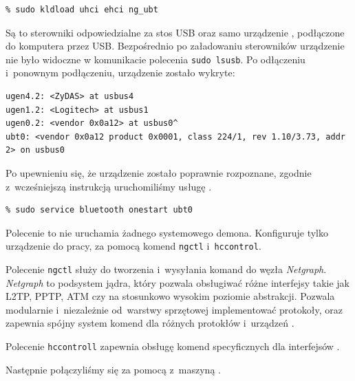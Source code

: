 \begin{lstlisting}
% sudo kldload uhci ehci ng_ubt
\end{lstlisting}

Są to sterowniki odpowiedzialne za stos USB oraz samo urządzenie \bt,
podłączone do komputera przez USB. Bezpośrednio po załadowaniu sterowników
urządzenie nie było widoczne w komunikacie polecenia \texttt{sudo lsusb}. Po
odłączeniu i~ponownym podłączeniu, urządzenie zostało wykryte:

\begin{lstlisting}[caption={Potwierdzenie w logu systemowym, że urządzenie \bt{} zostało wykryte.}]
% dmesg | tail
ugen4.2: <ZyDAS> at usbus4
ugen1.2: <Logitech> at usbus1
ugen0.2: <vendor 0x0a12> at usbus0^
ubt0: <vendor 0x0a12 product 0x0001, class 224/1, rev 1.10/3.73, addr 2> on usbus0
\end{lstlisting}

Po upewnieniu się, że urządzenie zostało poprawnie rozpoznane, zgodnie
z~wcześniejszą instrukcją uruchomiliśmy usługę \bt.

\begin{lstlisting}
% sudo service bluetooth onestart ubt0
\end{lstlisting}

Polecenie to nie uruchamia żadnego systemowego demona. Konfiguruje tylko
urządzenie \bt{} do pracy, za pomocą komend \texttt{ngctl} i~\texttt{hccontrol}.

Polecenie \texttt{ngctl} służy do tworzenia i~wysyłania komand do węzła
\emph{Netgraph}. \emph{Netgraph} to podsystem jądra, który pozwala obsługiwać
różne interfejsy takie jak L2TP, PPTP, ATM czy \bt{} na stosunkowo wysokim
poziomie abstrakcji. Pozwala modularnie i~niezależnie od~warstwy sprzętowej
implementować protokoły, oraz zapewnia spójny system komend dla różnych
protokłów i~urządzeń \cite{man:netgraph}.

Polecenie \texttt{hccontroll} zapewnia obsługę komend specyficznych dla
interfejsów \bt.

Następnie połączyliśmy się za pomocą \bt{} z~maszyną \kosiem.


